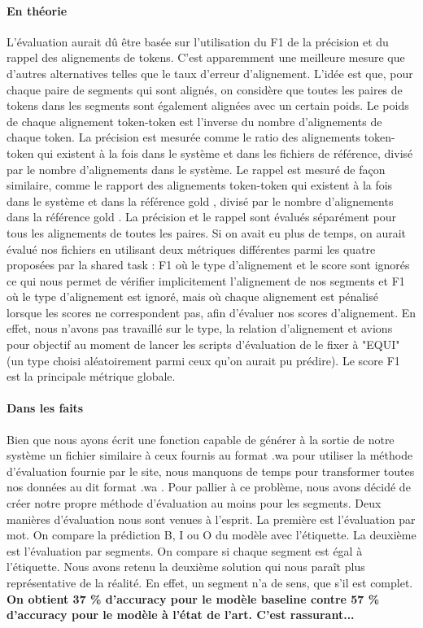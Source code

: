 \documentclass[a4paper, twoside, 11pt]{article}
\begin{document}
 \paragraph{En théorie}
 L'évaluation aurait dû être basée sur l'utilisation du F1 de la précision et du rappel des alignements de tokens. C'est apparemment une meilleure mesure que d'autres alternatives telles que le taux d'erreur d'alignement. L'idée est que, pour chaque paire de segments qui sont alignés, on considère que toutes les paires de tokens dans les segments sont également alignées avec un certain poids. Le poids de chaque alignement token-token est l'inverse du nombre d'alignements de chaque token. La précision est mesurée comme le ratio des alignements token-token qui existent à la fois dans le système et dans les fichiers de référence, divisé par le nombre d'alignements dans le système. Le rappel est mesuré de façon similaire, comme le rapport des alignements token-token qui existent à la fois dans le système et dans la référence \og gold \fg{}, divisé par le nombre d'alignements dans la référence \og gold \fg{}. La précision et le rappel sont évalués séparément pour tous les alignements de toutes les paires. Si on avait eu plus de temps, on aurait évalué nos fichiers en utilisant deux métriques différentes parmi les quatre proposées par la \og shared task\fg{} : F1 où le type d'alignement et le score sont ignorés ce qui nous permet de vérifier implicitement l'alignement de nos segments et F1 où le type d'alignement est ignoré, mais où chaque alignement est pénalisé lorsque les scores ne correspondent pas, afin d'évaluer nos scores d'alignement. En effet, nous n'avons pas travaillé sur le type, la relation d'alignement et avions pour objectif au moment de lancer les scripts d'évaluation de le fixer à "EQUI" (un type choisi aléatoirement parmi ceux qu'on aurait pu prédire). Le score F1 est la principale métrique globale.
 \paragraph{Dans les faits}
 Bien que nous ayons écrit une fonction capable de générer à la sortie de notre système un fichier similaire à ceux fournis au format \og .wa \fg{} pour utiliser la méthode d’évaluation fournie par le site, nous manquons de temps pour transformer toutes nos données au dit format \og .wa \fg{}. Pour pallier à ce problème, nous avons décidé de créer notre propre méthode d’évaluation au moins pour les segments. Deux manières d’évaluation nous sont venues à l’esprit. La première est l’évaluation par mot. On compare la prédiction B, I ou O du modèle avec l'étiquette. La deuxième est l’évaluation par segments. On compare si chaque segment est égal à l'étiquette. Nous avons retenu la deuxième solution qui nous paraît plus représentative de la réalité. En effet, un segment n’a de sens, que s’il est complet. \textbf{On obtient 37 \% d'accuracy pour le modèle baseline contre 57 \% d'accuracy pour le modèle à l'état de l'art. C'est rassurant...}
\end{document}
